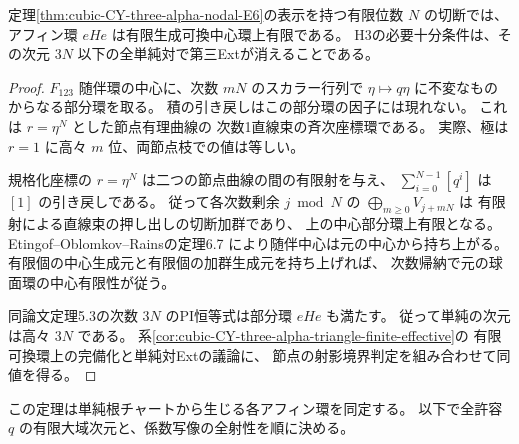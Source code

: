 \begin{proposition}\label{prop:cubic-CY-three-alpha-nodal-E6-finite}
定理\ref{thm:cubic-CY-three-alpha-nodal-E6}の表示を持つ有限位数 $N$ の切断では、
アフィン環 $eHe$ は有限生成可換中心環上有限である。
H3の必要十分条件は、その次元 $3N$ 以下の全単純対で第三Extが消えることである。
\end{proposition}
\begin{proof}
$F_{123}$ 随伴環の中心に、次数 $mN$ のスカラー行列で
$\eta\mapsto q\eta$ に不変なものからなる部分環を取る。
積の引き戻しはこの部分環の因子には現れない。
これは $r=\eta^N$ とした節点有理曲線の
次数1直線束の斉次座標環である。
実際、極は $r=1$ に高々 $m$ 位、両節点枝での値は等しい。

規格化座標の $r=\eta^N$ は二つの節点曲線の間の有限射を与え、
$\sum_{i=0}^{N-1}[q^i]$ は $[1]$ の引き戻しである。
従って各次数剰余 $j\bmod N$ の
$\bigoplus_{m\ge0}V_{j+mN}$ は
有限射による直線束の押し出しの切断加群であり、
上の中心部分環上有限となる。
Etingof--Oblomkov--Rainsの定理6.7
\cite{EtingofOblomkovRainsGDaha}により随伴中心は元の中心から持ち上がる。
有限個の中心生成元と有限個の加群生成元を持ち上げれば、
次数帰納で元の球面環の中心有限性が従う。

同論文定理5.3の次数 $3N$ のPI恒等式は部分環 $eHe$ も満たす。
従って単純の次元は高々 $3N$ である。
系\ref{cor:cubic-CY-three-alpha-triangle-finite-effective}の
有限可換環上の完備化と単純対Extの議論に、
節点の射影境界判定を組み合わせて同値を得る。
\end{proof}

この定理は単純根チャートから生じる各アフィン環を同定する。
以下で全許容 $q$ の有限大域次元と、係数写像の全射性を順に決める。

